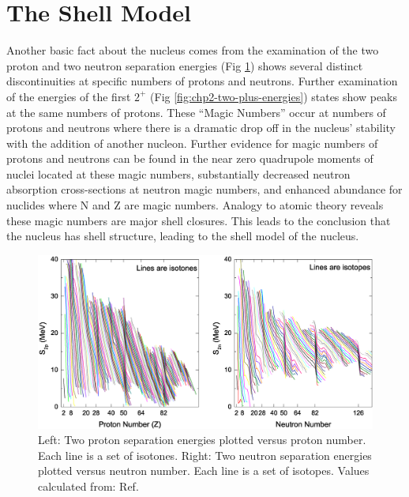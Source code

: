 \section{The Shell Model}
\label{sec:models-shell-model}

Another basic fact about the nucleus comes from the examination of the two proton and two neutron separation energies (Fig \ref{fig:chp2-masses}) shows several distinct discontinuities at specific numbers of protons and neutrons. Further examination of the energies of the first $2^+$ (Fig \ref{fig:chp2-two-plus-energies}) states show peaks at the same numbers of protons. These ``Magic Numbers'' occur at numbers of protons and neutrons where there is a dramatic drop off in the nucleus' stability with the addition of another nucleon. Further evidence for magic numbers of protons and neutrons can be found in the near zero quadrupole moments of nuclei located at these magic numbers, substantially decreased neutron absorption cross-sections at neutron magic numbers, and enhanced abundance for nuclides where N and Z are magic numbers. Analogy to atomic theory reveals these magic numbers are major shell closures. This leads to the conclusion that the nucleus has shell structure, leading to the shell model of the nucleus.

\begin{figure}[h!]
\centerline{\includegraphics[width=\textwidth]{./img/c2/2nuc_sep_en.eps}}
	\caption{Left: Two proton separation energies plotted versus proton number. Each line is a set of isotones. Right: Two neutron separation energies plotted versus neutron number. Each line is a set of isotopes. Values calculated from: Ref.\cite{AME20031,AME20032}\label{fig:chp2-masses}}
\end{figure}

